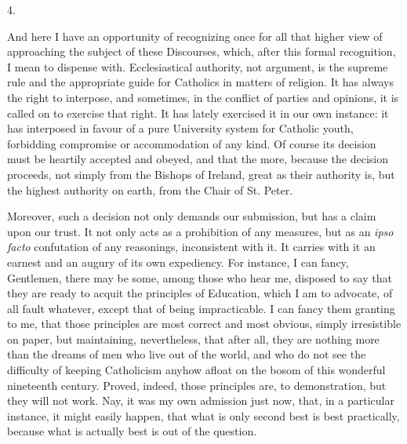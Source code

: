4.

And here I have an opportunity of recognizing once for all that
higher view of approaching the subject of these Discourses, which,
after this formal recognition, I mean to dispense with. Ecclesiastical
authority, not argument, is the supreme rule and the appropriate guide
for Catholics in matters of religion. It has always the right to
interpose, and sometimes, in the conflict of parties and opinions, it
is called on to exercise that right. It has lately exercised it in our
own instance: it has interposed in favour of a pure University system
for Catholic youth, forbidding compromise or accommodation of any
kind. Of course its decision must be heartily accepted and obeyed, and
that the more, because the decision proceeds, not simply from the
Bishops of Ireland, great as their authority is, but the highest
authority on earth, from the Chair of St. Peter.

Moreover, such a decision not only demands our submission, but has
a claim upon our trust. It not only acts as a prohibition of any
measures, but as an \emph{ipso facto} confutation of any reasonings,
inconsistent with it. It carries with it an earnest and an augury of
its own expediency. For instance, I can fancy, Gentlemen, there may be
some, among those who hear me, disposed to say that they are ready to
acquit the principles of Education, which I am to advocate, of all
fault whatever, except that of being impracticable. I can fancy them
granting to me, that those principles are most correct and most
obvious, simply irresistible on paper, but maintaining, nevertheless,
that after all, they are nothing more than the dreams of men who
live out of the world, and who do not see the difficulty of keeping
Catholicism anyhow afloat on the bosom of this wonderful nineteenth
century. Proved, indeed, those principles are, to demonstration, but
they will not work. Nay, it was my own admission just now, that, in a
particular instance, it might easily happen, that what is only second
best is best practically, because what is actually best is out of the
question.

